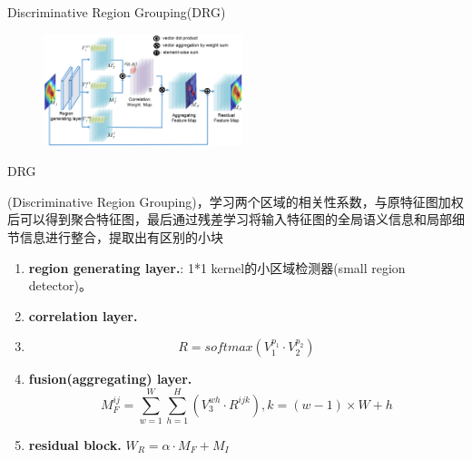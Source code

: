 \begin{frame}{Discriminative Region Grouping(DRG)}
    \begin{multicols}{2}
        \begin{figure}
            \centering
            \includegraphics[width=0.52\textwidth]{docs/paperReading/CDL/dgr.png}
        \end{figure}
        
        DRG
        \begin{scriptsize}
            (Discriminative Region Grouping)，学习两个区域的相关性系数，与原特征图加权后可以得到聚合特征图，最后通过残差学习将输入特征图的全局语义信息和局部细节信息进行整合，提取出有区别的小块
            \begin{enumerate}
                \item \textbf{region generating layer.}: 1*1 kernel的小区域检测器(small region detector)。
                \item \textbf{correlation layer.}
                \item \begin{equation}
                    R=softmax(V_1^{p_1}\cdot V_2^{p_2})
                \end{equation}
                \item \textbf{fusion(aggregating) layer.}
                \begin{equation}
                    M_F^{ij}=\sum_{w=1}^W\sum_{h=1}^H(V_3^{wh}\cdot R^{ijk}),k=(w-1)\times W+h
                \end{equation}
                \item \textbf{residual block.} $W_R=\alpha\cdot M_F+M_I$
            \end{enumerate}
        \end{scriptsize}
    \end{multicols}
        
\end{frame}

